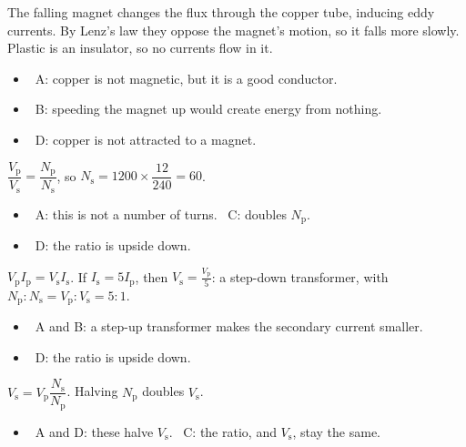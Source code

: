\documentclass[12pt]{article}
\begin{document}
\begin{practiceanswers}
\begin{practiceans}
  The falling magnet changes the flux through the copper tube, inducing eddy currents. By Lenz's law
  they oppose the magnet's motion, so it falls more slowly. Plastic is an insulator, so no currents flow
  in it.
  \begin{itemize}
    \item \xmark\ A: copper is not magnetic, but it is a good conductor.
    \item \xmark\ B: speeding the magnet up would create energy from nothing.
    \item \xmark\ D: copper is not attracted to a magnet.
  \end{itemize}
\end{practiceans}

\begin{practiceans}
  $\dfrac{V_\mathrm{p}}{V_\mathrm{s}} = \dfrac{N_\mathrm{p}}{N_\mathrm{s}}$, so
  $N_\mathrm{s} = 1200 \times \dfrac{12}{240} = 60$.
  \begin{itemize}
    \item \xmark\ A: this is not a number of turns. \quad \xmark\ C: doubles $N_\mathrm{p}$.
    \item \xmark\ D: the ratio is upside down.
  \end{itemize}
\end{practiceans}

\begin{practiceans}
  $V_\mathrm{p}I_\mathrm{p} = V_\mathrm{s}I_\mathrm{s}$. If $I_\mathrm{s} = 5I_\mathrm{p}$, then
  $V_\mathrm{s} = \frac{V_\mathrm{p}}{5}$: a step-down transformer, with
  $N_\mathrm{p} : N_\mathrm{s} = V_\mathrm{p} : V_\mathrm{s} = 5 : 1$.
  \begin{itemize}
    \item \xmark\ A and B: a step-up transformer makes the secondary current smaller.
    \item \xmark\ D: the ratio is upside down.
  \end{itemize}
\end{practiceans}

\begin{practiceans}
  $V_\mathrm{s} = V_\mathrm{p}\dfrac{N_\mathrm{s}}{N_\mathrm{p}}$. Halving $N_\mathrm{p}$ doubles $V_\mathrm{s}$.
  \begin{itemize}
    \item \xmark\ A and D: these halve $V_\mathrm{s}$. \quad \xmark\ C: the ratio, and $V_\mathrm{s}$, stay the same.
  \end{itemize}
\end{practiceans}


\end{practiceanswers}
\end{document}
